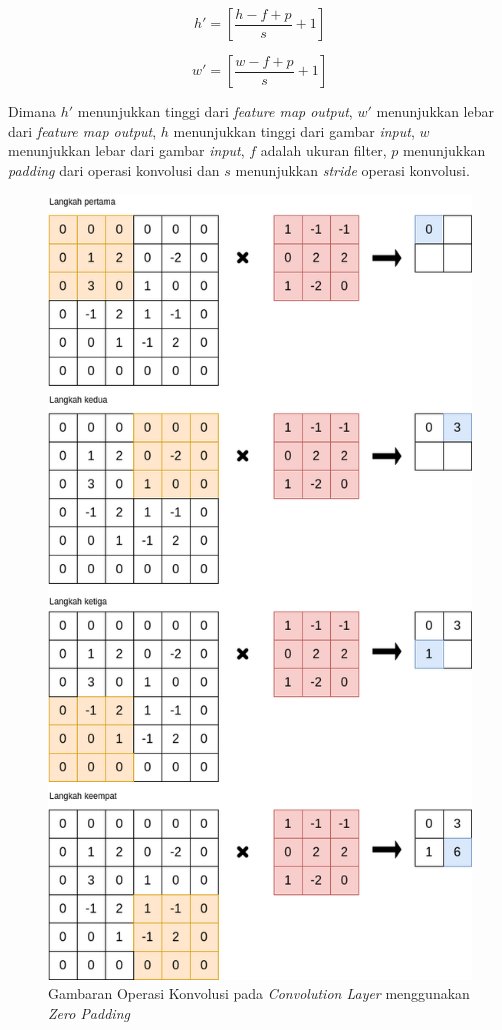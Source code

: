 \begin{equation}
	h'= \left[ \frac{h-f+p}{s} +1 \right]  
\end{equation}

\begin{equation}
	w'= \left[ \frac{w-f+p}{s} +1 \right]
\end{equation}

Dimana $h'$ menunjukkan tinggi dari \textit{feature map output}, $w'$ menunjukkan lebar dari \textit{feature map output}, $h$ menunjukkan tinggi dari gambar \textit{input}, $w$ menunjukkan lebar dari gambar \textit{input}, $f$ adalah ukuran filter, $p$ menunjukkan \textit{padding} dari operasi konvolusi dan $s$ menunjukkan \textit{stride} operasi konvolusi.

\begin{figure}[h!]
	\centering
	\includegraphics[scale=0.25]{gambar/conv-step-padd.png}
	\caption{Gambaran Operasi Konvolusi pada \textit{Convolution Layer} menggunakan \textit{Zero Padding}}
	\label{fig:conv-step-padd}
\end{figure}

